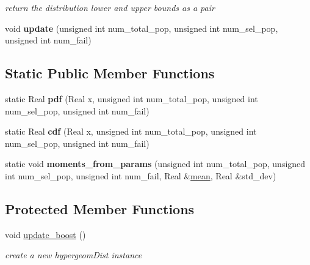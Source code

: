 \begin{DoxyCompactItemize}
\begin{DoxyCompactList}\small\item\em return the distribution lower and upper bounds as a pair \end{DoxyCompactList}\item 
void {\bfseries update} (unsigned int num\+\_\+total\+\_\+pop, unsigned int num\+\_\+sel\+\_\+pop, unsigned int num\+\_\+fail)\label{classPecos_1_1HypergeometricRandomVariable_aac16771ac4604936c4ec99a1d665681b}

\end{DoxyCompactItemize}
\subsection*{Static Public Member Functions}
\begin{DoxyCompactItemize}
\item 
static Real {\bfseries pdf} (Real x, unsigned int num\+\_\+total\+\_\+pop, unsigned int num\+\_\+sel\+\_\+pop, unsigned int num\+\_\+fail)\label{classPecos_1_1HypergeometricRandomVariable_ad536f2435516578fc4c52f0ebb38d118}

\item 
static Real {\bfseries cdf} (Real x, unsigned int num\+\_\+total\+\_\+pop, unsigned int num\+\_\+sel\+\_\+pop, unsigned int num\+\_\+fail)\label{classPecos_1_1HypergeometricRandomVariable_a449e63e2051ca3d9edb98cf6818b11eb}

\item 
static void {\bfseries moments\+\_\+from\+\_\+params} (unsigned int num\+\_\+total\+\_\+pop, unsigned int num\+\_\+sel\+\_\+pop, unsigned int num\+\_\+fail, Real \&\hyperlink{classPecos_1_1HypergeometricRandomVariable_a962ffe5a3593be370d5c883365c060f4}{mean}, Real \&std\+\_\+dev)\label{classPecos_1_1HypergeometricRandomVariable_adcb597703487a69778a15aed04d8ebc0}

\end{DoxyCompactItemize}
\subsection*{Protected Member Functions}
\begin{DoxyCompactItemize}
\item 
void \hyperlink{classPecos_1_1HypergeometricRandomVariable_aaa6750cbee2245416a6eeeac58d4405a}{update\+\_\+boost} ()\label{classPecos_1_1HypergeometricRandomVariable_aaa6750cbee2245416a6eeeac58d4405a}

\begin{DoxyCompactList}\small\item\em create a new hypergeom\+Dist instance \end{DoxyCompactList}\end{DoxyCompactItemize}
